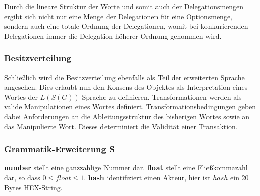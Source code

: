 \documentclass[]{article}
\begin{document}
Durch die lineare Struktur der Worte und somit auch der Delegationsmengen ergibt sich nicht nur eine Menge der Delegationen für eine Optionsmenge, sondern auch eine totale Ordnung der Delegationen, womit bei konkurierenden Delegationen immer die Delegation höherer Ordnung genommen wird. 




\subsubsection*{Besitzverteilung}

Schließlich wird die Besitzverteilung ebenfalls als Teil der erweiterten Sprache angesehen. Dies erlaubt nun den Konsens des Objektes als Interpretation eines Wortes der $L(S(G))$ Sprache zu definieren. Transformationen werden als valide Manipulationen eines Wortes definiert. Transformationsbedingungen geben dabei Anforderungen an die Ableitungsstruktur des bisherigen Wortes sowie an das Manipulierte Wort. Dieses determiniert die Validität einer Transaktion.








\subsubsection*{Grammatik-Erweiterung S}


\textbf{number} stellt eine ganzzahlige Nummer dar. \textbf{float}
stellt eine Fließkommazahl dar, so dass $0\leq float \leq 1$. \textbf{hash} identifiziert einen Akteur, hier ist $hash$ ein 20 Bytes HEX-String. \\
\end{document}
